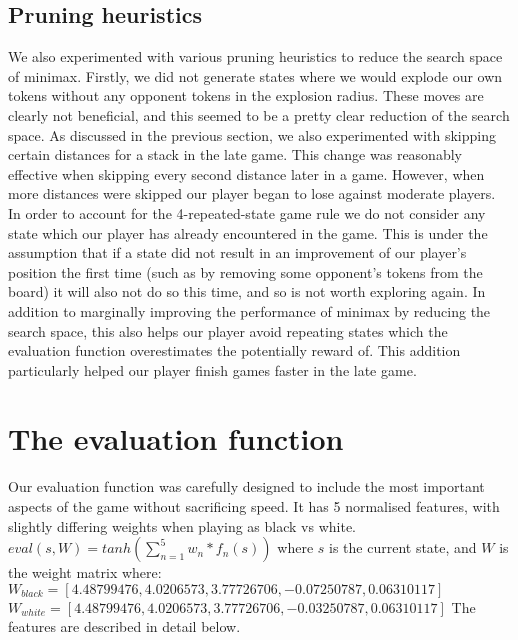\documentclass[11pt]{article}
\newcommand{\drafting}[1]{\textcolor{OliveGreen}{#1}}
\begin{document}
\subsection{Pruning heuristics}
We also experimented with various pruning heuristics to reduce the search space of minimax. \drafting{Firstly, we did not generate states where we would explode our own tokens without any opponent tokens in the explosion radius. These moves are clearly not beneficial, and this seemed to be a pretty clear reduction of the search space. As discussed in the previous section, we also experimented with skipping certain distances for a stack in the late game. This change was reasonably effective when skipping every second distance later in a game. However, when more distances were skipped our player began to lose against moderate players}. In order to account for the 4-repeated-state game rule we do not consider any state which our player has already encountered in the game. This is under the assumption that if a state did not result in an improvement of our player's position the first time (such as by removing some opponent's tokens from the board) it will also not do so this time, and so is not worth exploring again. In addition to marginally improving the performance of minimax by reducing the search space, this also helps our player avoid repeating states which the evaluation function overestimates the potentially reward of. This addition particularly helped our player finish games faster in the late game.



\section{The evaluation function}
\drafting{Our evaluation function was carefully designed to include the most important aspects of the game without sacrificing speed. It has 5 normalised features, with slightly differing weights when playing as black vs white.
$eval(s,W) = tanh\left(\sum_{n=1}^{5} w_n * f_n(s)\right)$
where $s$ is the current state, and $W$ is the weight matrix where:
$W_{black} = [ 4.48799476,  4.0206573 ,  3.77726706, -0.07250787,  0.06310117]$
$W_{white} = [ 4.48799476,  4.0206573 ,  3.77726706, -0.03250787,  0.06310117]$
The features are described in detail below.
}
\end{document}
